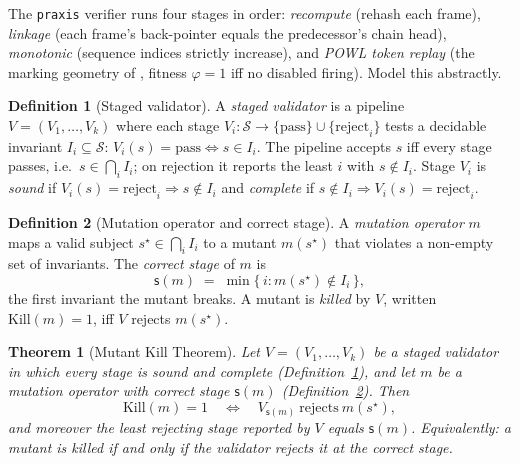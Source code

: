 \documentclass[11pt,oneside]{book}
\theoremstyle{definition}
\newtheorem{definition}{Definition}[chapter]
\theoremstyle{plain}
\newtheorem{theorem}{Theorem}[chapter]
\theoremstyle{remark}
\newcommand{\Fitness}{\varphi}
\newcommand{\code}[1]{\texttt{#1}}
\newcommand{\Kill}{\mathrm{Kill}}
\newcommand{\stg}{\mathsf{s}}                  %
\begin{document}
The \code{praxis} verifier runs four stages in order: \emph{recompute} (rehash each frame),
\emph{linkage} (each frame's back-pointer equals the predecessor's chain head), \emph{monotonic}
(sequence indices strictly increase), and \emph{POWL token replay} (the marking geometry of
\cite[Ch.~5]{keystone}, fitness $\Fitness=1$ iff no disabled firing). Model this abstractly.

\begin{definition}[Staged validator]\label{def:staged}
A \emph{staged validator} is a pipeline $V=(V_1,\dots,V_k)$ where each stage
$V_i:\mathcal{S}\to\{\text{pass}\}\cup\{\text{reject}_i\}$ tests a decidable invariant
$I_i\subseteq\mathcal{S}$: $V_i(s)=\text{pass}\iff s\in I_i$. The pipeline accepts $s$ iff every
stage passes, i.e.\ $s\in\bigcap_i I_i$; on rejection it reports the least $i$ with $s\notin I_i$.
Stage $V_i$ is \emph{sound} if $V_i(s)=\text{reject}_i\Rightarrow s\notin I_i$ and \emph{complete}
if $s\notin I_i\Rightarrow V_i(s)=\text{reject}_i$.
\end{definition}

\begin{definition}[Mutation operator and correct stage]\label{def:mut}
A \emph{mutation operator} $m$ maps a valid subject $s^\star\in\bigcap_i I_i$ to a mutant $m(s^\star)$
that violates a non-empty set of invariants. The \emph{correct stage} of $m$ is
\[
\stg(m)\;=\;\min\{\,i : m(s^\star)\notin I_i\,\},
\]
the first invariant the mutant breaks. A mutant is \emph{killed} by $V$, written $\Kill(m)=1$, iff
$V$ rejects $m(s^\star)$.
\end{definition}

\begin{theorem}[Mutant Kill Theorem]\label{thm:kill}
Let $V=(V_1,\dots,V_k)$ be a staged validator in which every stage is sound and complete
(Definition~\ref{def:staged}), and let $m$ be a mutation operator with correct stage $\stg(m)$
(Definition~\ref{def:mut}). Then
\[
\Kill(m)=1\quad\Longleftrightarrow\quad V_{\stg(m)}\ \text{rejects}\ m(s^\star),
\]
and moreover the least rejecting stage reported by $V$ equals $\stg(m)$. Equivalently: a mutant
is killed if and only if the validator rejects it at the correct stage.
\end{theorem}
\end{document}
